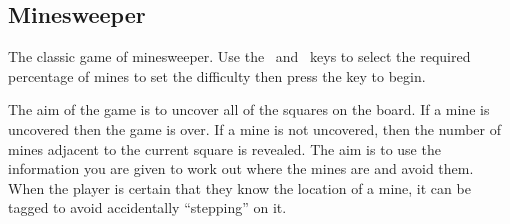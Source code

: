 \subsection{Minesweeper}
The classic game of minesweeper. Use 
    {the \ButtonUp\ and \ButtonDown\ keys}
to select the required percentage of mines to set the difficulty 
then press the 
key to begin.

The aim of the game is to uncover all of the squares on the board.  If a
mine is uncovered then the game is over. If a mine is not uncovered,
then the number of mines adjacent to the current square is revealed. 
The aim is to use the information you are given to work out where the
mines are and avoid them.  When the player is certain that they know
the location of a mine, it can be tagged to avoid accidentally
``stepping'' on it.

